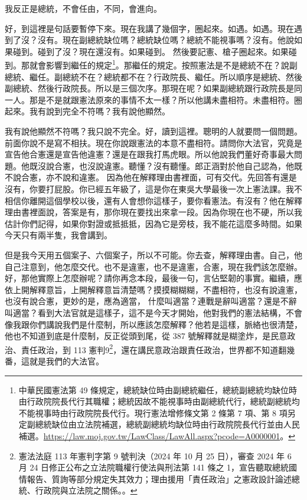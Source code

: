 \hypertarget{c08:cue:72}{}我反正是總統，不會任由，不同，會進向。\par{}好，到這裡是句話要暫停下來。現在我講了幾個字，圈起來。如遇。如遇。現在遇到了沒？沒有。現在副總統缺位嗎？總統缺位嗎？總統不能視事嗎？沒有。他說如果碰到。碰到了沒？現在還沒有。如果碰到。
\hypertarget{c08:cue:73}{}然後要記憲、槍子圈起來。如果碰到。那就會影響到繼任的規定\footnote{中華民國憲法第 49 條規定，總統缺位時由副總統繼任，總統副總統均缺位時由行政院院長代行其職權；總統因故不能視事時由副總統代行，總統副總統均不能視事時由行政院院長代行。現行憲法增修條文第 2 條第 7 項、第 8 項另定副總統缺位由立法院補選，總統副總統均缺位時由行政院院長代行並由人民補選。\url{https://law.moj.gov.tw/LawClass/LawAll.aspx?pcode=A0000001}。}。那繼任的規定。按照憲法是不是總統不在？說副總統、繼任。副總統不在？總統都不在？行政院長、繼任。所以順序是總統、然後副總統、然後行政院長。所以是三個次序。那現在呢？如果副總統跟行政院長是同一人。那是不是就跟憲法原來的事情不太一樣？所以他講未盡相符。未盡相符。圈起來。我有說到完全不符嗎？我有說他顯然。

\hypertarget{c08:cue:74}{}我有說他顯然不符嗎？我只說不完全。好，讀到這裡。聰明的人就要問一個問題。前面你說不是寫不相扶。現在你說跟憲法的本意不盡相符。請問你大法官，究竟是宣告他合憲還是宣告他違憲？還是在跟我打馬虎眼。所以他說我們董好奇事最大問題。他既沒說合憲，也沒說違憲。聽懂？沒有聽懂。郎正涵對於他自己認為，他既不說合憲，亦不說和違憲。
\hypertarget{c08:cue:75}{}因為他在解釋理由書裡面，可有交代。先回答有還是沒有，你要打屁股。你已經五年級了，這是你在東吳大學最後一次上憲法課。我不相信你離開這個學校以後，還有人會想你這樣子，要你看憲法。有沒有？他在解釋理由書裡面說，答案是有，那你現在要找出來拿一段。因為你現在也不硬，所以我估計你們記得，如果你對證或抵抵抵，因為它是旁枝，我不能花這麼多時間。如果今天只有兩半隻，我會講到。

\hypertarget{c08:cue:76}{}但是我今天用五個案子、六個案子，所以不可能。你去查，解釋理由書。自己，他自己注意到，他怎麼交代。也不是違憲，也不是違憲，合憲，現在我們該怎麼辦。好，那他實際上怎麼辦呢？請你再念本段，最後一句，言佔堅韌的事實。繼續，應依上開解釋意旨，上開解釋意旨清楚嗎？摸摸糊糊糊，不盡相符，也沒有說違憲，也沒有說合憲，更妙的是，應為適當，
\hypertarget{c08:cue:77}{}什麼叫適當？連戰是辭叫適當？還是不辭叫適當？看到大法官就是這樣子，這不是今天才開始，他對我們的憲法結構，不會像我跟你們講說我們是什麼制，所以應該怎麼解釋？他若是這樣，脈絡也很清楚，他也不知道到底是什麼制，反正從頭到尾，從 387 號解釋就是糊塗炸，是民意政治、責任政治，到 113 憲判9\footnote{憲法法庭 113 年憲判字第 9 號判決（2024 年 10 月 25 日），審查 2024 年 6 月 24 日修正公布之立法院職權行使法與刑法第 141 條之 1，宣告聽取總統國情報告、質詢等部分規定失其效力；理由援用「責任政治」之憲政設計論述總統、行政院與立法院之關係。\cite{ccj113-9}。}，還在講民意政治跟責任政治，世界都不知道翻幾番，這就是我們的大法官。

